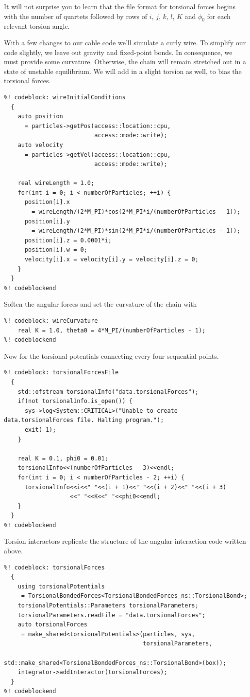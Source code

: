 It will not surprise you to learn that the file format for torsional forces
begins with the number of quartets followed by rows of $i$, $j$, $k$, $l$, $K$
and $\phi_0$ for each relevant torsion angle.

With a few changes to our cable code we'll simulate a curly wire. To simplify
our code slightly, we leave out gravity and fixed-point bonds. In consequence,
we must provide some curvature. Otherwise, the chain will remain stretched out
in a state of unstable equilibrium. We will add in a slight torsion as well, to
bias the torsional forces.
\begin{lstlisting}
%! codeblock: wireInitialConditions
  {
    auto position
      = particles->getPos(access::location::cpu,
                          access::mode::write);
    auto velocity
      = particles->getVel(access::location::cpu,
                          access::mode::write);

    real wireLength = 1.0;
    for(int i = 0; i < numberOfParticles; ++i) {
      position[i].x
        = wireLength/(2*M_PI)*cos(2*M_PI*i/(numberOfParticles - 1));
      position[i].y
        = wireLength/(2*M_PI)*sin(2*M_PI*i/(numberOfParticles - 1));
      position[i].z = 0.0001*i;
      position[i].w = 0;
      velocity[i].x = velocity[i].y = velocity[i].z = 0;
    }
  }
%! codeblockend
\end{lstlisting}
Soften the angular forces and set the curvature of the chain with
\begin{lstlisting}
%! codeblock: wireCurvature
    real K = 1.0, theta0 = 4*M_PI/(numberOfParticles - 1);
%! codeblockend
\end{lstlisting}
Now for the torsional potentials connecting every four sequential points.
\begin{lstlisting}
%! codeblock: torsionalForcesFile
  {
    std::ofstream torsionalInfo("data.torsionalForces");
    if(not torsionalInfo.is_open()) {
      sys->log<System::CRITICAL>("Unable to create data.torsionalForces file. Halting program.");
      exit(-1);
    }

    real K = 0.1, phi0 = 0.01;
    torsionalInfo<<(numberOfParticles - 3)<<endl;
    for(int i = 0; i < numberOfParticles - 2; ++i) {
      torsionalInfo<<i<<" "<<(i + 1)<<" "<<(i + 2)<<" "<<(i + 3)
                   <<" "<<K<<" "<<phi0<<endl;
    }
  }
%! codeblockend
\end{lstlisting}
Torsion interactors replicate the structure of the angular interaction code
written above.
\begin{lstlisting}
%! codeblock: torsionalForces
  {
    using torsionalPotentials
     = TorsionalBondedForces<TorsionalBondedForces_ns::TorsionalBond>;
    torsionalPotentials::Parameters torsionalParameters;
    torsionalParameters.readFile = "data.torsionalForces";
    auto torsionalForces
     = make_shared<torsionalPotentials>(particles, sys,
                                        torsionalParameters,
                                        std::make_shared<TorsionalBondedForces_ns::TorsionalBond>(box));
    integrator->addInteractor(torsionalForces);
  }
%! codeblockend
\end{lstlisting}
